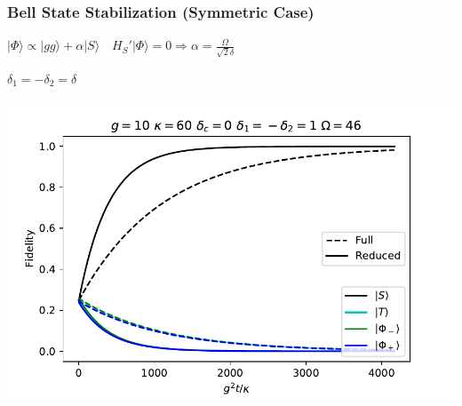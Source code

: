 \documentclass{beamer}
\begin{document}
\begin{frame}
\centering 
\frametitle{ Bell State Stabilization (Symmetric Case)}
  $ |\Phi \rangle \propto |gg\rangle + \alpha | S \rangle  \quad H_S'| \Phi \rangle = 0 \Longrightarrow \alpha = \frac{\Omega}{\sqrt{2} \delta }$
  
\vspace{3mm}  
  
  $\delta_1 = - \delta_2 = \delta$

\includegraphics[scale=.6]{Sym_stabilization.pdf}

\end{frame}
\end{document}
